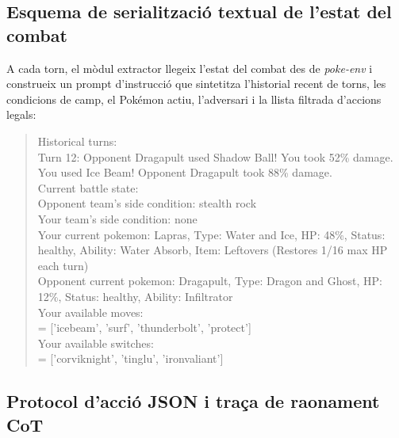 \subsection{Esquema de serialització textual de l'estat del combat}

A cada torn, el mòdul extractor llegeix l'estat del combat des de \textit{poke-env} i construeix un prompt d'instrucció que sintetitza l'historial recent de torns, les condicions de camp, el Pokémon actiu, l'adversari i la llista filtrada d'accions legals:

\begin{quote}
\small\ttfamily\raggedright
Historical turns: \\
Turn 12: Opponent Dragapult used Shadow Ball! You took 52\% damage. You used Ice Beam! Opponent Dragapult took 88\% damage. \\
Current battle state: \\
Opponent team's side condition: stealth rock \\
Your team's side condition: none \\
Your current pokemon: Lapras, Type: Water and Ice, HP: 48\%, Status: healthy, Ability: Water Absorb, Item: Leftovers (Restores 1/16 max HP each turn) \\
Opponent current pokemon: Dragapult, Type: Dragon and Ghost, HP: 12\%, Status: healthy, Ability: Infiltrator \\
Your available moves: \\
 = ['icebeam', 'surf', 'thunderbolt', 'protect'] \\
Your available switches: \\
 = ['corviknight', 'tinglu', 'ironvaliant']
\end{quote}

\subsection{Protocol d'acció JSON i traça de raonament CoT}

